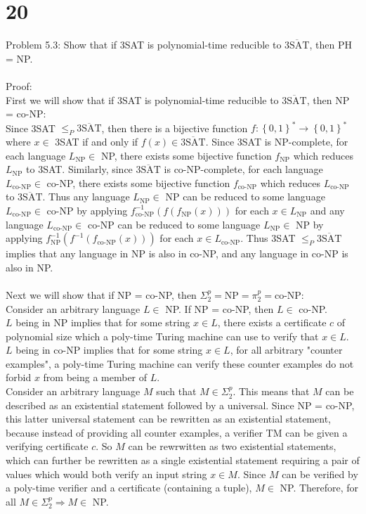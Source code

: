 \documentclass[letterpaper,notitlepage,twoside]{article}
\renewcommand{\implies}{\Rightarrow} %
\begin{document}
\section*{20}
Problem 5.3: Show that if 3SAT is polynomial-time reducible to $\overline{\text{3SAT}}$, then PH = NP.
\\\\
Proof:\\
First we will show that if 3SAT is polynomial-time reducible to $\overline{\text{3SAT}}$, then NP = co-NP:\\
Since 3SAT $\le_P \overline{\text{3SAT}}$, then there is a bijective function $f: \left\{ 0,1 \right\}^* \rightarrow \left\{ 0,1 \right\}^*$ where $x \in $ 3SAT if and only if $f(x) \in \overline{\text{3SAT}}$. Since 3SAT is NP-complete, for each language $L_{\text{NP}} \in$ NP, there exists some bijective function $f_{\text{NP}}$ which reduces $L_{\text{NP}}$ to 3SAT. Similarly, since $\overline{\text{3SAT}}$ is co-NP-complete, for each language $L_{\text{co-NP}} \in$ co-NP, there exists some bijective function $f_{\text{co-NP}}$ which reduces $L_{\text{co-NP}}$ to $\overline{\text{3SAT}}$. Thus any language $L_{\text{NP}} \in $ NP can be reduced to some language $L_{\text{co-NP}} \in$ co-NP by applying $f^{-1}_{\text{co-NP}}(f(f_{\text{NP}}(x)))$ for each $x \in L_{\text{NP}}$ and any language $L_{\text{co-NP}} \in $ co-NP can be reduced to some language $L_{\text{NP}} \in$ NP by applying $f^{-1}_{\text{NP}}(f^{-1}(f_{\text{co-NP}}(x)))$ for each $x \in L_{\text{co-NP}}$. Thus 3SAT $\le_P \overline{\text{3SAT}}$ implies that any language in NP is also in co-NP, and any language in co-NP is also in NP. 
\\\\
Next we will show that if NP = co-NP, then $\Sigma_2^p = \text{NP} = \pi_2^p = \text{co-NP}$:\\
Consider an arbitrary language $L \in$ NP. If NP = co-NP, then $L \in$ co-NP.\\
$L$ being in NP implies that for some string $x \in L$, there exists a certificate $c$ of polynomial size which a poly-time Turing machine can use to verify that $x \in L$. \\
$L$ being in co-NP implies that for some string $x \in L$, for all arbitrary "counter examples", a poly-time Turing machine can verify these counter examples do not forbid $x$ from being a member of $L$. \\

Consider an arbitrary language $M$ such that $M \in \Sigma_2^p$. This means that $M$ can be described as an existential statement followed by a universal. Since NP = co-NP, this latter universal statement can be rewritten as an existential statement, because instead of providing all counter examples, a verifier TM can be given a verifying certificate $c$. So $M$ can be rewrwitten as two existential statements, which can further be rewritten as a single existential statement requiring a pair of values which would both verify an input string $x \in M$. Since $M$ can be verified by a poly-time verifier and a certificate (containing a tuple), $M \in$ NP. Therefore, for all $M \in \Sigma_2^p \implies M \in$ NP. \\
\end{document}
